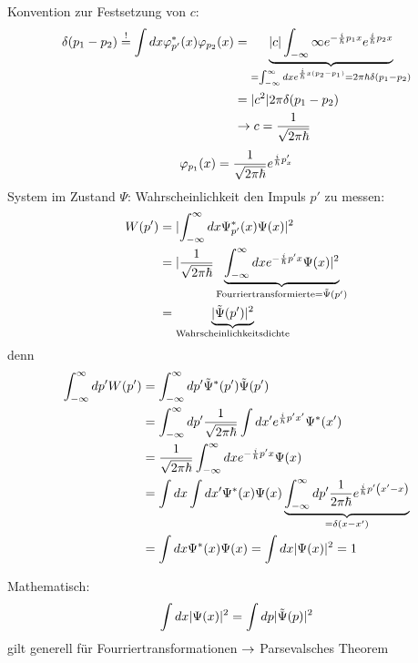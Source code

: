 Konvention zur Festsetzung von $c$:
\begin{align*}
    \delta(p_1 - p_2) \overset{!}{=} \int dx \varphi_{p'}^*(x) \varphi_{p_2}(x)
    &=
    \underbrace{\lvert c \rvert \int_{-\infty}{\infty} e^{- \frac{i}{\hbar} p_1 x}
    e^{\frac{i}{\hbar}  p_2 x}}_{=\int_{-\infty}^{\infty} dx e^{\frac{i}{\hbar} x \left(
    p_2 - p_1 \right)} = 2 \pi \hbar \delta (p_1 - p_2)} \\
    &=
    \lvert c^2 \rvert 2 \pi \delta(p_1 - p_2) \\
    &\rightarrow c= \frac{1}{\sqrt{2\pi\hbar}}
\end{align*}
\begin{equation*}
    \varphi_{p_1}(x) = \frac{1}{\sqrt{2 \pi \hbar}} e^{\frac{i}{\hbar} p'_x}
\end{equation*}
System im Zustand $\Psi$: Wahrscheinlichkeit den Impuls $p'$ zu messen:
\begin{align*}
    W(p')
    &=
    \lvert \int_{-\infty}^{\infty} dx \Psi_{p'}^*(x) \Psi(x) \rvert^2 \\
    &=
    \lvert \frac{1}{\sqrt{2\pi\hbar}} 
    \underbrace{\int_{-\infty}^{\infty} dx e^{-\frac{i}{\hbar}p'x}\Psi(x)
    \rvert^2}_{\text{Fourriertransformierte} = \tilde{\Psi}(p')} \\
    &=
    \underbrace{\lvert \tilde{\Psi}(p')\rvert^2}_{\text{Wahrscheinlichkeitsdichte}}
\end{align*}
denn
\begin{align*}
    \int_{-\infty}^{\infty} dp' W(p')
    &=
    \int_{-\infty}^{\infty} dp' \tilde{\Psi}^*(p') \tilde{\Psi}(p') \\
    &=
    \int_{-\infty}^{\infty} dp' \frac{1}{\sqrt{2 \pi \hbar}}
    \int dx' e^{\frac{i}{\hbar} p' x'} \Psi^*(x') \\
    &=
    \frac{1}{\sqrt{2 \pi \hbar}} \int_{-\infty}^{\infty} dx e^{- \frac{i}{\hbar}p'
    x} \Psi(x)\\
    &=
    \int dx \int dx' \Psi^*(x)\Psi(x)
    \underbrace{\int_{-\infty}^{\infty} dp' \frac{1}{2 \pi \hbar}
    e^{\frac{i}{\hbar} p' \left( x' - x \right) }}_{=\delta(x-x')}\\
    &=
    \int dx \Psi^*(x)\Psi(x) = \int dx \lvert \Psi(x) \rvert^2 = 1
\end{align*}
\begin{eins}{Mathematisch:}
     \begin{equation*}
         \int dx \lvert \Psi(x) \rvert^2 = \int dp \lvert \tilde{\Psi}(p) \rvert^2
     \end{equation*}
     gilt generell für Fourriertransformationen $\rightarrow$ Parsevalsches Theorem
\end{eins}
